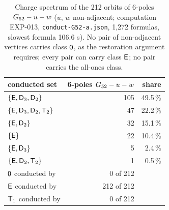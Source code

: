 \begin{table}[t]\centering\small
\begin{tabular}{lrr}
\toprule
conducted set & 6-poles $G_{52} - u - w$ & share \\
\midrule
$\{\mathsf{E},\mathsf{D}_3,\mathsf{D}_2\}$ & 105 & 49.5\,\% \\
$\{\mathsf{E},\mathsf{D}_3,\mathsf{D}_2,\mathsf{T}_2\}$ & 47 & 22.2\,\% \\
$\{\mathsf{E},\mathsf{D}_2\}$ & 32 & 15.1\,\% \\
$\{\mathsf{E}\}$ & 22 & 10.4\,\% \\
$\{\mathsf{E},\mathsf{D}_3\}$ & 5 & 2.4\,\% \\
$\{\mathsf{E},\mathsf{D}_2,\mathsf{T}_2\}$ & 1 & 0.5\,\% \\
\midrule
$\mathsf{0}$ conducted by & 0 of 212 & \\
$\mathsf{E}$ conducted by & 212 of 212 & \\
$\mathsf{T}_1$ conducted by & 0 of 212 & \\
\bottomrule
\end{tabular}
\caption{Charge spectrum of the 212 orbits of 6-poles $G_{52} - u - w$ ($u$, $w$ non-adjacent; computation EXP-013, \texttt{conduct-G52-a.json}, 1,272 formulas, slowest formula 106.6 s). No pair of non-adjacent vertices carries class $\mathsf{0}$, as the restoration argument requires; every pair can carry class $\mathsf{E}$; no pair carries the all-ones class.}\label{tab:g52}
\end{table}
